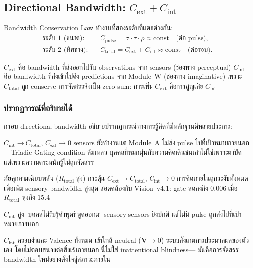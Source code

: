 \documentclass[12pt,a4paper]{article}
\newcommand{\Rtot}{R_{\mathrm{total}}}
\newcommand{\Cext}{C_{\mathrm{ext}}}
\newcommand{\Cint}{C_{\mathrm{int}}}
\newcommand{\pp}[1]{\textbf{#1}}
\begin{document}
\subsection{Directional Bandwidth: $\Cext + \Cint$}

Bandwidth Conservation Law ทำงานที่สองระดับที่แตกต่างกัน:
\begin{align}
  \text{ระดับ~1 (ขนาด):}\quad
    &C_{\mathrm{pulse}} = \sigma\cdot\tau\cdot\rho \approx \mathrm{const}
     \quad \text{(ต่อ pulse)}, \label{eq:L1}\\
  \text{ระดับ~2 (ทิศทาง):}\quad
    &C_{\mathrm{total}} = \Cext + \Cint \approx \mathrm{const}
     \quad \text{(ต่อรอบ)}. \label{eq:L2}
\end{align}

$\Cext$ คือ bandwidth ที่ส่งออกไปรับ observations จาก sensors (ช่องทาง perceptual)
$\Cint$ คือ bandwidth ที่ส่งเข้าไปดึง predictions จาก Module~W (ช่องทาง imaginative)
เพราะ $C_{\mathrm{total}}$ ถูก conserve การจัดสรรจึงเป็น zero-sum:
การเพิ่ม $\Cext$ คือการสูญเสีย $\Cint$

\subsubsection{ปรากฏการณ์ที่อธิบายได้}

กรอบ directional bandwidth อธิบายปรากฏการณ์ทางการรู้คิดที่มีหลักฐานดีหลายประการ:

\begin{description}[leftmargin=1.4em]
  \item[\pp{Inattentional blindness:}] $\Cint\to C_{\mathrm{total}}$,
    $\Cext\to 0$ sensors ยังทำงานแต่ Module~A ไม่ส่ง pulse
    ไปที่เป้าหมายภายนอก---Triadic Gating condition ล้มเหลว
    บุคคลที่หมกมุ่นกับความคิดเดินชนเสาไม่ใช่เพราะตาปิด
    แต่เพราะความตระหนักรู้ไม่ถูกจัดสรร
  \item[\pp{Survival reflex:}] ภัยคุกคามเฉียบพลัน ($\Rtot$ สูง)
    กระตุ้น $\Cext\to C_{\mathrm{total}}$, $\Cint\to 0$
    การคิดภายในถูกระงับทั้งหมดเพื่อเพิ่ม sensory bandwidth สูงสุด
    สอดคล้องกับ Vision~v4.1: gate ลดลงถึง $0.006$ เมื่อ $\Rtot$ พุ่งถึง $15.4$
  \item[\pp{Deep thinking:}] $\Cint$ สูง; บุคคลไม่รับรู้คำพูดที่พูดออกมา
    sensory sensors ยิงปกติ แต่ไม่มี pulse ถูกส่งไปที่เป้าหมายภายนอก
  \item[\pp{Meditative equanimity:}] $\Cint$ ครอบงำและ Valence ทั้งหมด
    เข้าใกล้ neutral ($\mathbf{V}\to 0$) ระบบสังเกตการประมวลผลของตัวเอง
    โดยไม่ตอบสนองต่อสิ่งเร้าภายนอก นี่ไม่ใช่ inattentional blindness---
    มันคือการจัดสรร bandwidth ใหม่อย่างตั้งใจสู่สภาวะภายใน
\end{description}
\end{document}
